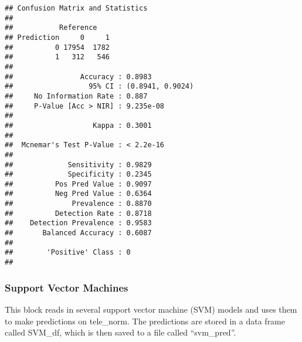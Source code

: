 \documentclass[
]{article}
\newenvironment{Shaded}{\begin{snugshade}}{\end{snugshade}}
\newcommand{\DecValTok}[1]{\textcolor[rgb]{0.00,0.00,0.81}{#1}}
\newcommand{\FunctionTok}[1]{\textcolor[rgb]{0.00,0.00,0.00}{#1}}
\newcommand{\NormalTok}[1]{#1}
\newcommand{\OtherTok}[1]{\textcolor[rgb]{0.56,0.35,0.01}{#1}}
\newcommand{\SpecialCharTok}[1]{\textcolor[rgb]{0.00,0.00,0.00}{#1}}
\newcommand{\StringTok}[1]{\textcolor[rgb]{0.31,0.60,0.02}{#1}}
\begin{document}
\begin{Shaded}
\end{Shaded}

\begin{verbatim}
## Confusion Matrix and Statistics
## 
##           Reference
## Prediction     0     1
##          0 17954  1782
##          1   312   546
##                                           
##                Accuracy : 0.8983          
##                  95% CI : (0.8941, 0.9024)
##     No Information Rate : 0.887           
##     P-Value [Acc > NIR] : 9.235e-08       
##                                           
##                   Kappa : 0.3001          
##                                           
##  Mcnemar's Test P-Value : < 2.2e-16       
##                                           
##             Sensitivity : 0.9829          
##             Specificity : 0.2345          
##          Pos Pred Value : 0.9097          
##          Neg Pred Value : 0.6364          
##              Prevalence : 0.8870          
##          Detection Rate : 0.8718          
##    Detection Prevalence : 0.9583          
##       Balanced Accuracy : 0.6087          
##                                           
##        'Positive' Class : 0               
## 
\end{verbatim}

\hypertarget{support-vector-machines}{%
\subsubsection{Support Vector Machines}\label{support-vector-machines}}

This block reads in several support vector machine (SVM) models and uses
them to make predictions on tele\_norm. The predictions are stored in a
data frame called SVM\_df, which is then saved to a file called
``svm\_pred''.
\end{document}
